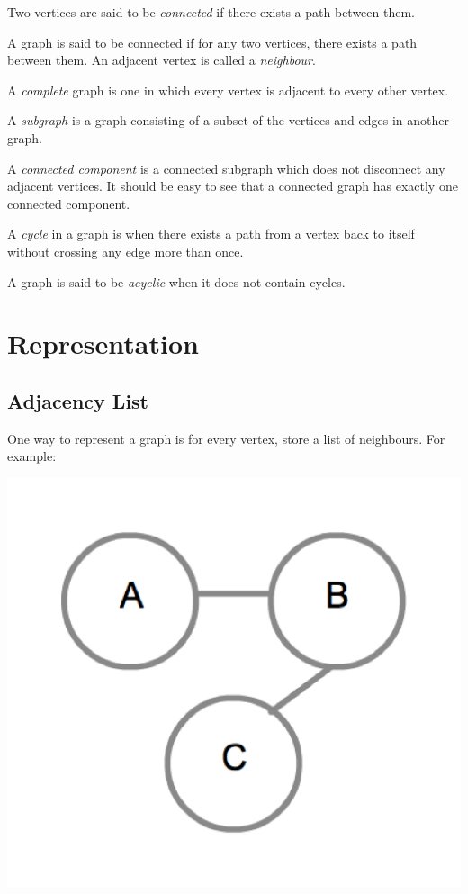 Two vertices are said to be \emph{connected} if there exists a path
between them.  

A graph is said to be connected if for any two vertices, there exists
a path between them. An adjacent vertex is called a \emph{neighbour}.

A \emph{complete} graph is one in which every vertex is adjacent to
every other vertex.

A \emph{subgraph} is a graph consisting of a subset of the vertices
and edges in another graph.

A \emph{connected component} is a connected subgraph which does
not disconnect any adjacent vertices.  It should be easy to see that a
connected graph has exactly one connected component.

A \emph{cycle} in a graph is when there exists a path from a vertex
back to itself without crossing any edge more than once.

A graph is said to be \emph{acyclic} when it does not contain cycles.

\section{Representation}

\subsection{Adjacency List}

One way to represent a graph is for every vertex, store a list of
neighbours.  For example:

{
  \includegraphics[scale=0.2]{SimpleGraph}
  \label{fig:SimpleGraph}
}


